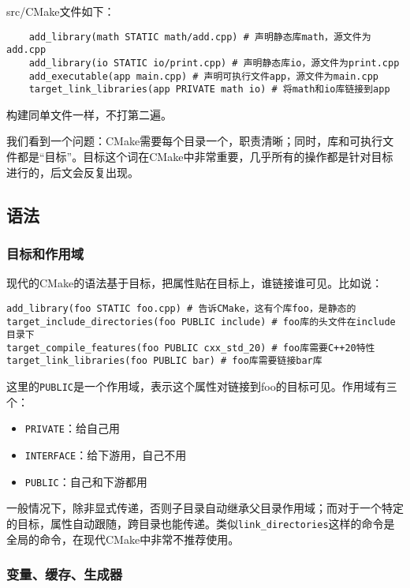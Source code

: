 src/CMake文件如下：
\begin{lstlisting}
    add_library(math STATIC math/add.cpp) # 声明静态库math，源文件为add.cpp
    add_library(io STATIC io/print.cpp) # 声明静态库io，源文件为print.cpp
    add_executable(app main.cpp) # 声明可执行文件app，源文件为main.cpp
    target_link_libraries(app PRIVATE math io) # 将math和io库链接到app
\end{lstlisting}

构建同单文件一样，不打第二遍。

我们看到一个问题：CMake需要每个目录一个，职责清晰；同时，库和可执行文件都是“目标”。目标这个词在CMake中非常重要，几乎所有的操作都是针对目标进行的，后文会反复出现。

\subsection{语法}

\subsubsection{目标和作用域}

现代的CMake的语法基于目标，把属性贴在目标上，谁链接谁可见。比如说：
\begin{lstlisting}
add_library(foo STATIC foo.cpp) # 告诉CMake，这有个库foo，是静态的
target_include_directories(foo PUBLIC include) # foo库的头文件在include目录下
target_compile_features(foo PUBLIC cxx_std_20) # foo库需要C++20特性
target_link_libraries(foo PUBLIC bar) # foo库需要链接bar库
\end{lstlisting}

这里的\texttt{PUBLIC}是一个作用域，表示这个属性对链接到foo的目标可见。作用域有三个：
\begin{itemize}
  \item \texttt{PRIVATE}：给自己用
  \item \texttt{INTERFACE}：给下游用，自己不用
  \item \texttt{PUBLIC}：自己和下游都用
\end{itemize}

一般情况下，除非显式传递，否则子目录自动继承父目录作用域；而对于一个特定的目标，属性自动跟随，跨目录也能传递。类似\texttt{link\_directories}这样的命令是全局的命令，在现代CMake中非常不推荐使用。

\subsubsection{变量、缓存、生成器}

